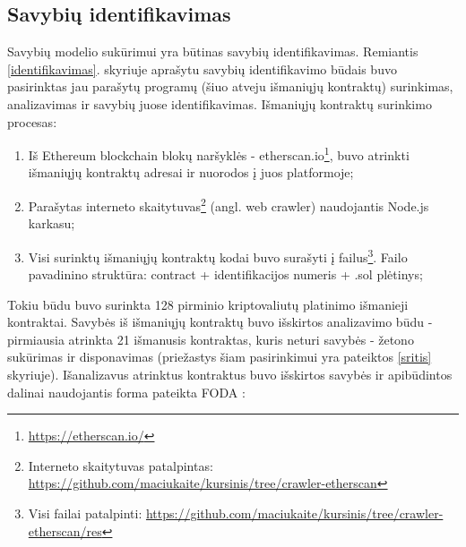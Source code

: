 \documentclass{VUMIFPSkursinis}
\begin{document}
\subsection{Savybių identifikavimas} \label{isskyrimas}

Savybių modelio sukūrimui yra būtinas savybių identifikavimas. Remiantis \ref{identifikavimas}. skyriuje aprašytu savybių identifikavimo būdais buvo pasirinktas jau parašytų programų (šiuo atveju išmaniųjų kontraktų) surinkimas, analizavimas ir savybių juose identifikavimas. Išmaniųjų kontraktų surinkimo procesas:
\begin{enumerate}[topsep=0pt,itemsep=-1ex,partopsep=1ex,parsep=1ex]
\item Iš Ethereum blockchain blokų naršyklės - etherscan.io\footnote{\url{https://etherscan.io/}}, buvo atrinkti išmaniųjų kontraktų adresai ir nuorodos į juos platformoje;
\item Parašytas interneto skaitytuvas\footnote{Interneto skaitytuvas patalpintas: \url{https://github.com/maciukaite/kursinis/tree/crawler-etherscan}} (angl. web crawler) naudojantis Node.js karkasu;
\item Visi surinktų išmaniųjų kontraktų kodai buvo surašyti į failus\footnote{Visi failai patalpinti: \url{ https://github.com/maciukaite/kursinis/tree/crawler-etherscan/res}}. Failo pavadinino struktūra: contract + identifikacijos numeris + .sol plėtinys;
\end{enumerate}

Tokiu būdu buvo surinkta 128 pirminio kriptovaliutų platinimo išmanieji kontraktai. Savybės iš išmaniųjų kontraktų buvo išskirtos analizavimo būdu - pirmiausia atrinkta 21 išmanusis kontraktas, kuris neturi savybės - žetono sukūrimas ir disponavimas (priežastys šiam pasirinkimui yra pateiktos \ref{sritis} skyriuje). Išanalizavus atrinktus kontraktus buvo išskirtos savybės ir apibūdintos dalinai naudojantis forma pateikta FODA \cite{Kang1990}:

\pagebreak
\end{document}
